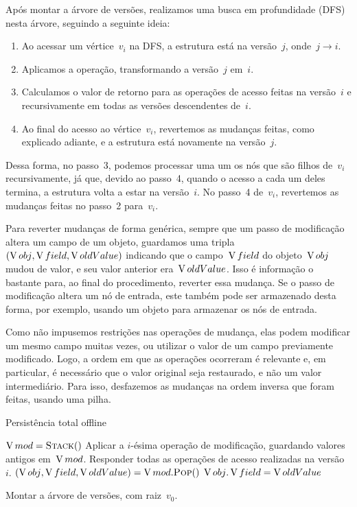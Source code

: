 \documentclass[main.tex]{subfiles}
\begin{document}
Após montar a árvore de versões, realizamos uma busca em profundidade (DFS) nesta árvore, seguindo a seguinte ideia:
\begin{enumerate}
	\item Ao acessar um vértice~$v_i$ na DFS, a estrutura está na versão~$j$, onde~$j \rightarrow i$.
	\item Aplicamos a operação, transformando a versão~$j$ em~$i$.
	\item Calculamos o valor de retorno para as operações de acesso feitas na versão~$i$ e recursivamente em todas as versões descendentes de~$i$.
	\item Ao final do acesso ao vértice~$v_i$, revertemos as mudanças feitas, como explicado adiante, e a estrutura está novamente na versão~$j$.
\end{enumerate}

Dessa forma, no passo~3, podemos processar uma  um os nós que são filhos de~$v_i$ recursivamente, já que, devido ao passo~4, quando o acesso a cada um deles termina, a estrutura volta a estar na versão~$i$. No passo~4 de~$v_i$, revertemos as mudanças feitas no passo~2 para~$v_i$.

Para reverter mudanças de forma genérica, sempre que um passo de modificação altera um campo de um objeto, guardamos uma tripla~$(\operatorname{V}{obj}, \operatorname{V}{field}, \operatorname{V}{oldValue})$ indicando que o campo~$\operatorname{V}{field}$ do objeto~$\operatorname{V}{obj}$ mudou de valor, e seu valor anterior era~$\operatorname{V}{oldValue}$. Isso é informação o bastante para, ao final do procedimento, reverter essa mudança. Se o passo de modificação altera um nó de entrada, este também pode ser armazenado desta forma, por exemplo, usando um objeto para armazenar os nós de entrada.

Como não impusemos restrições nas operações de mudança, elas podem modificar um mesmo campo muitas vezes, ou utilizar o valor de um campo previamente modificado. Logo, a ordem em que as operações ocorreram é relevante e, em particular, é necessário que o valor original seja restaurado, e não um valor intermediário. Para isso, desfazemos as mudanças na ordem inversa que foram feitas, usando uma pilha.

\begin{algorithm}
\caption{Persistência total offline} \label{lst:geraloffline}
\begin{algorithmic}[1]

	\State $\V{mod} = \Call{Stack}{\null}$
	\State Aplicar a $i$-ésima operação de modificação, guardando valores antigos em~$\operatorname{V}{mod}$.\label{line:off:opmod}
	\State Responder todas as operações de acesso realizadas na versão~$i$. \label{line:off:opac}
	 \label{line:off:for}
		\State {}
	\EndFor
	 \label{line:off:while}
		\State $(\V{obj}, \V{field}, \V{oldValue}) = \V{mod}.\Call{Pop}{\null}$
		\State $\operatorname{V}{obj}.\operatorname{V}{field} = \operatorname{V}{oldValue}$
	\EndWhile
\EndFunction

	\State Montar a árvore de versões, com raiz~$v_0$.
	\State {}
\EndFunction

\end{algorithmic}
\end{algorithm}
\end{document}
